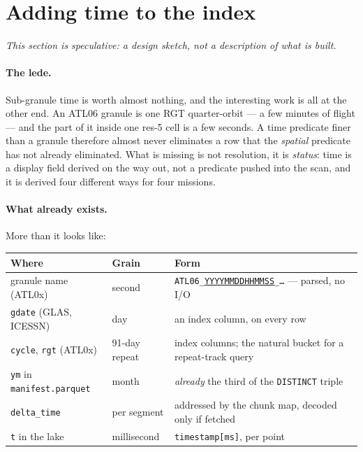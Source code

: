 \documentclass[11pt,a4paper]{article}
\newcommand{\code}[1]{\texttt{\small #1}}
\newcommand{\col}[1]{\texttt{\footnotesize #1}}
\begin{document}
\section{Adding time to the index}
\label{sec:time}

\emph{This section is speculative: a design sketch, not a description of what is built.}

\paragraph{The lede.} Sub-granule time is worth almost nothing, and the interesting work is all at the other
end. An ATL06 granule is one RGT quarter-orbit --- a few minutes of flight --- and the part of it inside one
res-5 cell is a few seconds. A time predicate finer than a granule therefore almost never eliminates a row
that the \emph{spatial} predicate has not already eliminated. What is missing is not resolution, it is
\emph{status}: time is a display field derived on the way out, not a predicate pushed into the scan, and it
is derived four different ways for four missions.

\paragraph{What already exists.} More than it looks like:

\begin{center}\small
\begin{tabular}{@{}llp{74mm}@{}}
\toprule
\textbf{Where} & \textbf{Grain} & \textbf{Form} \\
\midrule
granule name (ATL0x) & second   & \code{ATL06\_\underline{YYYYMMDDHHMMSS}\_\dots} --- parsed, no I/O \\
\col{gdate} (GLAS, ICESSN) & day & an index column, on every row \\
\col{cycle}, \col{rgt} (ATL0x) & 91-day repeat & index columns; the natural bucket for a repeat-track query \\
\col{ym} in \code{manifest.parquet} & month & \emph{already} the third of the \code{DISTINCT} triple \\
\col{delta\_time} & per segment & addressed by the chunk map, decoded only if fetched \\
\col{t} in the lake & millisecond & \code{timestamp[ms]}, per point \\
\bottomrule
\end{tabular}
\end{center}
\end{document}
